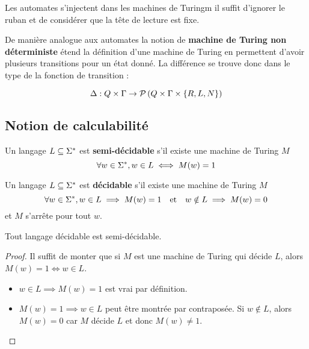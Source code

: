 \begin{remarque}
	Les automates s'injectent dans les machines de Turingm il suffit d'ignorer le ruban et de considérer que la tête de lecture est fixe.
\end{remarque}

\begin{definition}
	De manière analogue aux automates la notion de \textbf{machine de Turing non déterministe} étend la définition d'une machine de Turing en
	permettent d'avoir plusieurs transitions pour un état donné. La différence se trouve donc dans le type de la fonction de transition :

	$$ \Delta: Q \times \Gamma \to \mathcal{P}\left(Q \times \Gamma \times \{R, L, N\}\right)$$

\end{definition}


\subsection{Notion de calculabilité}


\begin{definition}
	Un langage $L \subseteq \Sigma^{*}$ est \textbf{semi-décidable} s'il existe une machine de Turing $M$ \tlq
	$$ \forall w \in \Sigma^{*}, w \in L \iff M(w) = 1 $$
\end{definition}

\begin{definition}
	Un langage $L \subseteq \Sigma^{*}$ est \textbf{décidable} s'il existe une machine de Turing $M$ \tlq
	$$ \forall w \in \Sigma^{*}, w \in L \implies M(w) = 1 \quad \text{et} \quad w \notin L \implies M(w) = 0 $$
	et $M$ s'arrête pour tout $w$.
\end{definition}

\begin{prop}
	Tout langage décidable est semi-décidable.
\end{prop}

\begin{proof}
	Il suffit de monter que si $M$ est une machine de Turing qui décide $L$, alors $M(w) = 1 \iff w \in L$.
	\begin{itemize}
		\item $w \in L \implies M(w) = 1$ est vrai par définition.
		\item $M(w) = 1 \implies w \in L$ peut être montrée par contraposée. Si $w \notin L$, alors $M(w) = 0$ car $M$ décide $L$ et donc $M(w) \neq 1$.
	\end{itemize}
\end{proof}


